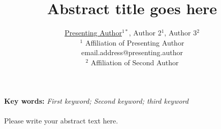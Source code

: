 \documentclass[a4paper,11pt]{article}
\begin{document}
\title{Abstract title goes here}
\author{
 \underline{Presenting Author}$^{1*}$, Author 2$^{1}$, Author 3$^{2}$ \\
$^{1}$ Affiliation of Presenting Author \\
 email.address@presenting.author \\
 $^{2}$ Affiliation of Second Author
}

\date{}
\maketitle

\noindent \textbf{Key words:}
\emph{%
First keyword; 
Second keyword;
third keyword
}
\\\\
Please write your abstract text here.




\end{document}
